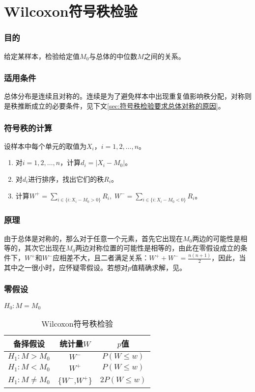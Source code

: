 \section{Wilcoxon符号秩检验}

\subsubsection{目的}
给定某样本，检验给定值$M_0$与总体的中位数$M$之间的关系。
\subsubsection{适用条件}
总体分布是连续且对称的。连续是为了避免样本中出现重复值影响秩分配，对称则是秩推断成立的必要条件，见下文\ref{sec:符号秩检验要求总体对称的原因}。
\subsubsection{符号秩的计算}
设样本中每个单元的取值为$X_i$，$i=1,2,\dots,n$。
\begin{enumerate}[leftmargin=*, labelindent=2em]
	\item 对$i=1,2,\dots,n$，计算$d_i=|X_i-M_0|$。
	\item 对$d_i$进行排序，找出它们的秩$R_i$。
	\item 计算$W^+=\sum\limits_{i\in\{i:X_i-M_0>0\}}R_i,\;W^-=\sum\limits_{i\in\{i:X_i-M_0<0\}}R_i$。
\end{enumerate}
\subsubsection{原理}
由于总体是对称的，那么对于任意一个元素，首先它出现在$M_0$两边的可能性是相等的，其次它出现在$M_0$两边对称位置的可能性是相等的\label{sec:符号秩检验要求总体对称的原因}，由此在零假设成立的条件下，$W^+$和$W^-$应相差不大，且二者满足关系：$W^+ + W^- = \frac{n(n+1)}{2}$，因此，当其中之一很小时，应怀疑零假设。若想对$p$值精确求解，见。
\subsubsection{零假设}
$H_0: M = M_0$

\begin{table}[htbp]
	\centering
	\begin{tabular}{ccc}
		\toprule
		备择假设 & 统计量$W$ & $p$值 \\
		\midrule 
		$H_1:M>M_0$ & $W^-$ & $P(W\leqslant w)$ \\
		$H_1:M<M_0$ & $W^+$ & $P(W\leqslant w)$ \\
		$H_1:M\ne M_0$ & \text{min}\{$W^-$,\;$W^+$\} & $2P(W\leqslant w)$ \\
		\bottomrule 
	\end{tabular}
	\caption{Wilcoxon符号秩检验}
\end{table}
	
